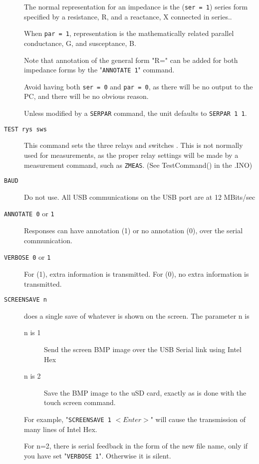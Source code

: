 \begin{description}
The normal representation for an impedance is the (\texttt{ser = 1}) series form specified by a resistance, R, and a reactance, X connected in series..

When \texttt{par = 1}, representation is the mathematically related parallel conductance, G, and susceptance, B.

Note that annotation of the general form "R=" can be added for both impedance forms by the "\texttt{ANNOTATE 1}" command.

Avoid having both \texttt{ser = 0} and \texttt{par = 0}, as there will be no output to the PC, and there will be no obvious reason.

Unless modified by a \texttt{SERPAR} command, the unit defaults to \newline \texttt{SERPAR 1 1}.

\item[\texttt{TEST rys sws}] This command sets the three relays and switches .  This is not normally used for measurements, as the proper relay settings will be made by a measurement command, such as \texttt{ZMEAS}.  (See TestCommand()  in the .INO)

\item[\texttt{BAUD}]   Do not use.  All USB communications on the USB port are at 12 MBits/sec

\item[\texttt{ANNOTATE 0} or \texttt{1}]  Responses can have annotation (1) or no annotation (0), over the serial communication.

\item[\texttt{VERBOSE 0} or \texttt{1}]  For (1), extra information is transmitted. For (0), no extra information is transmitted.

\item[\texttt{SCREENSAVE n}] does a single save of whatever is shown on the screen.  The parameter n is
\begin{description}
\item[n is 1] Send the screen BMP image over the USB Serial link using Intel Hex
\item[n is 2] Save the BMP image to the uSD card, exactly as is done with the touch screen command.
\end{description}

For example, "\texttt{SCREENSAVE 1} $<Enter>$" will cause the transmission of many lines of Intel Hex.

For n=2, there is serial feedback in the form of the new file name, only if you have set "\texttt{VERBOSE 1}".  Otherwise it is silent.


\end{description}
